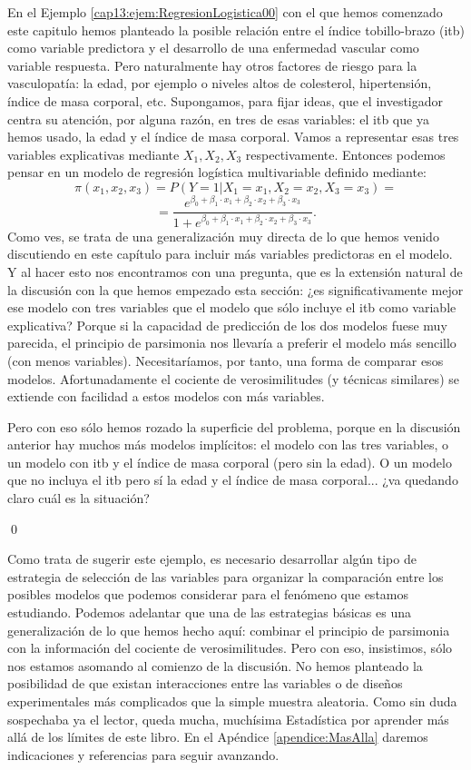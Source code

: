 \begin{ejemplo}
	\label{cap13:ejem:RegresionLogisticaMultivariableSeleccionModelos}
	En el Ejemplo \ref{cap13:ejem:RegresionLogistica00} con el que hemos comenzado este capitulo hemos planteado la posible relación entre el índice tobillo-brazo (itb) como variable predictora y el desarrollo de una enfermedad vascular como variable respuesta. Pero naturalmente hay otros factores de riesgo para la vasculopatía: la edad, por ejemplo o  niveles altos de colesterol, hipertensión, índice de masa corporal, etc. Supongamos, para fijar ideas, que el investigador centra su atención, por alguna razón, en tres de esas variables: el itb que ya hemos usado, la edad y el índice de masa corporal. Vamos a representar esas tres variables explicativas mediante $X_1, X_2, X_3$ respectivamente. Entonces podemos pensar en un modelo de regresión logística multivariable definido mediante:
\[
{\pi}(x_1, x_2, x_3) = P(Y=1|X_1=x_1, X_2 = x_2, X_3=x_3)= \]
\[
=\dfrac{
	e^{\beta_0+\beta_1\cdot x_1+\beta_2\cdot x_2+\beta_3\cdot x_3}
	}{
	1 + e^{\beta_0+\beta_1\cdot x_1+\beta_2\cdot x_2+\beta_3\cdot x_3}
	}.
\]
Como ves, se trata de una generalización muy directa de lo que hemos venido discutiendo en este capítulo para incluir más variables predictoras en el modelo. Y al hacer esto nos encontramos con una pregunta, que es la extensión natural de la discusión con la que hemos empezado esta sección: ¿es significativamente mejor ese modelo con tres variables que el modelo que sólo incluye el itb como variable explicativa? Porque si la capacidad de predicción de los dos modelos fuese muy parecida, el principio de parsimonia nos llevaría a preferir el modelo más sencillo (con menos variables). Necesitaríamos, por tanto, una forma de comparar esos modelos. Afortunadamente el cociente de verosimilitudes (y técnicas similares) se extiende con facilidad a estos modelos con más variables.

Pero con eso sólo hemos rozado la superficie del problema, porque en la discusión anterior hay muchos más modelos implícitos: el modelo con las tres variables, o un modelo con itb y el índice de masa corporal (pero sin la edad). O un modelo
que no incluya el itb pero sí la edad y el índice de masa corporal... ¿va quedando claro cuál es la situación?

\qed	
\end{ejemplo}
Como trata de sugerir este ejemplo, es necesario desarrollar algún tipo de estrategia de selección de las variables para organizar la comparación entre los posibles modelos que podemos considerar para el fenómeno que estamos estudiando. Podemos adelantar que una de las estrategias básicas es una generalización de lo que hemos hecho aquí: combinar el principio de parsimonia con la información del cociente de verosimilitudes.  Pero con eso, insistimos, sólo nos estamos asomando al comienzo de la discusión. No hemos planteado la posibilidad de que existan  interacciones entre las variables o de diseños experimentales más complicados que la simple muestra aleatoria. Como sin duda sospechaba ya el lector, queda mucha, muchísima Estadística por aprender más allá de los límites de este libro. En el Apéndice \ref{apendice:MasAlla} daremos indicaciones y referencias para seguir avanzando.

